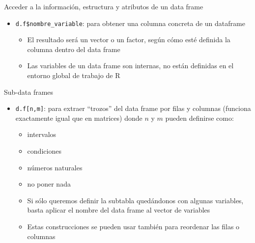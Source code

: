 \documentclass[
  ignorenonframetext,
  aspectratio=169]{beamer}
\providecommand{\tightlist}{%
  \setlength{\itemsep}{0pt}\setlength{\parskip}{0pt}}
\begin{document}
\begin{frame}[fragile]{Acceder a la información, estructura y atributos
de un data frame}
\label{acceder-a-la-informaciuxf3n-estructura-y-atributos-de-un-data-frame-4}
\begin{itemize}
\tightlist
\item
  \texttt{d.f\$nombre\_variable}: para obtener una columna concreta de
  un dataframe

  \begin{itemize}
  \tightlist
  \item
    El resultado será un vector o un factor, según cómo esté definida la
    columna dentro del data frame
  \item
    Las variables de un data frame son internas, no están definidas en
    el entorno global de trabajo de R
  \end{itemize}
\end{itemize}
\end{frame}

\begin{frame}[fragile]{Sub-data frames}
\label{sub-data-frames}
\begin{itemize}
\tightlist
\item
  \texttt{d.f{[}n,m{]}}: para extraer ``trozos'' del data frame por
  filas y columnas (funciona exactamente igual que en matrices) donde
  \(n\) y \(m\) pueden definirse como:

  \begin{itemize}
  \tightlist
  \item
    intervalos
  \item
    condiciones
  \item
    números naturales
  \item
    no poner nada
  \item
    Si sólo queremos definir la subtabla quedándonos con algunas
    variables, basta aplicar el nombre del data frame al vector de
    variables
  \item
    Estas construcciones se pueden usar también para reordenar las filas
    o columnas
  \end{itemize}
\end{itemize}
\end{frame}
\end{document}
